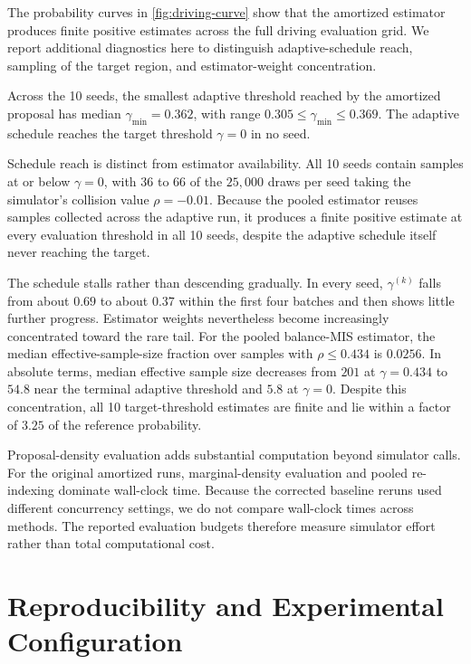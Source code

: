 The probability curves in \cref{fig:driving-curve} show that the amortized estimator produces finite positive estimates across the full driving evaluation grid. We report additional diagnostics here to distinguish adaptive-schedule reach, sampling of the target region, and estimator-weight concentration.

Across the 10 seeds, the smallest adaptive threshold reached by the amortized proposal has median $\gamma_{\min}=0.362$, with range $0.305\leq\gamma_{\min}\leq0.369$. The adaptive schedule reaches the target threshold $\gamma=0$ in no seed.

Schedule reach is distinct from estimator availability. All 10 seeds contain samples at or below $\gamma=0$, with 36 to 66 of the $25{,}000$ draws per seed taking the simulator's collision value $\rho=-0.01$. Because the pooled estimator reuses samples collected across the adaptive run, it produces a finite positive estimate at every evaluation threshold in all 10 seeds, despite the adaptive schedule itself never reaching the target.

The schedule stalls rather than descending gradually. In every seed, $\gamma^{(k)}$ falls from about $0.69$ to about $0.37$ within the first four batches and then shows little further progress. Estimator weights nevertheless become increasingly concentrated toward the rare tail. For the pooled balance-MIS estimator, the median effective-sample-size fraction over samples with $\rho\leq0.434$ is $0.0256$. In absolute terms, median effective sample size decreases from $201$ at $\gamma=0.434$ to $54.8$ near the terminal adaptive threshold and $5.8$ at $\gamma=0$. Despite this concentration, all 10 target-threshold estimates are finite and lie within a factor of $3.25$ of the reference probability.

Proposal-density evaluation adds substantial computation beyond simulator calls. For the original amortized runs, marginal-density evaluation and pooled re-indexing dominate wall-clock time. Because the corrected baseline reruns used different concurrency settings, we do not compare wall-clock times across methods. The reported evaluation budgets therefore measure simulator effort rather than total computational cost.

\section{Reproducibility and Experimental Configuration}
\label{app:reproducibility}

